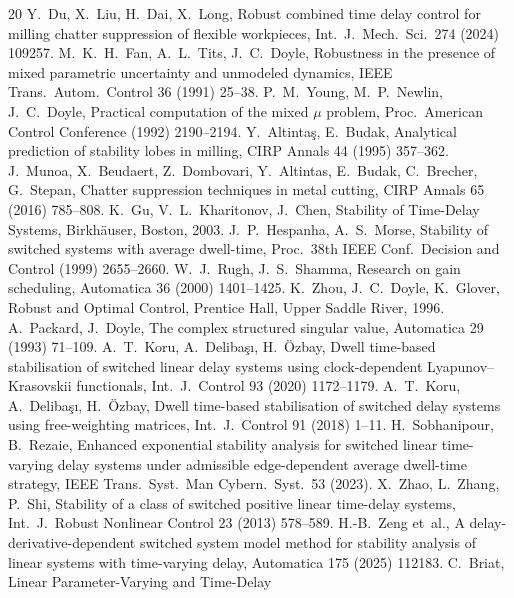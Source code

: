 \documentclass[preprint,12pt]{elsarticle}
\begin{document}
\begin{thebibliography}{20}
 Y.~Du, X.~Liu, H.~Dai, X.~Long, Robust combined
time delay control for milling chatter suppression of flexible
workpieces, Int.\ J.\ Mech.\ Sci.\ 274 (2024) 109257.
 M.~K.~H.~Fan, A.~L.~Tits, J.~C.~Doyle, Robustness in
the presence of mixed parametric uncertainty and unmodeled dynamics,
IEEE Trans.\ Autom.\ Control 36 (1991) 25--38.
 P.~M.~Young, M.~P.~Newlin, J.~C.~Doyle, Practical
computation of the mixed $\mu$ problem, Proc.\ American Control
Conference (1992) 2190--2194.
 Y.~Altinta\c{s}, E.~Budak, Analytical
prediction of stability lobes in milling, CIRP Annals 44 (1995)
357--362.
 J.~Munoa, X.~Beudaert, Z.~Dombovari, Y.~Altintas,
E.~Budak, C.~Brecher, G.~Stepan, Chatter suppression techniques in
metal cutting, CIRP Annals 65 (2016) 785--808.
 K.~Gu, V.~L.~Kharitonov, J.~Chen, Stability of
Time-Delay Systems, Birkh\"auser, Boston, 2003.
 J.~P.~Hespanha, A.~S.~Morse, Stability of
switched systems with average dwell-time, Proc.\ 38th IEEE Conf.\
Decision and Control (1999) 2655--2660.
 W.~J.~Rugh, J.~S.~Shamma, Research on gain
scheduling, Automatica 36 (2000) 1401--1425.
 K.~Zhou, J.~C.~Doyle, K.~Glover, Robust and Optimal
Control, Prentice Hall, Upper Saddle River, 1996.
 A.~Packard, J.~Doyle, The complex structured
singular value, Automatica 29 (1993) 71--109.
 A.~T.~Koru, A.~Deliba\c{s}{\i}, H.~\"Ozbay, Dwell
time-based stabilisation of switched linear delay systems using
clock-dependent Lyapunov--Krasovskii functionals, Int.\ J.\ Control
93 (2020) 1172--1179.
 A.~T.~Koru, A.~Deliba\c{s}{\i}, H.~\"Ozbay, Dwell
time-based stabilisation of switched delay systems using
free-weighting matrices, Int.\ J.\ Control 91 (2018) 1--11.
 H.~Sobhanipour, B.~Rezaie, Enhanced
exponential
stability analysis for switched linear time-varying delay systems
under admissible edge-dependent average dwell-time strategy, IEEE
Trans.\ Syst.\ Man Cybern.\ Syst.\ 53 (2023).
 X.~Zhao, L.~Zhang, P.~Shi, Stability of a class
of switched positive linear time-delay systems, Int.\ J.\ Robust
Nonlinear Control 23 (2013) 578--589.
 H.-B.~Zeng et~al., A delay-derivative-dependent
switched system model method for stability analysis of linear systems
with time-varying delay, Automatica 175 (2025) 112183.
 C.~Briat, Linear Parameter-Varying and Time-Delay

\end{thebibliography}
\end{document}
